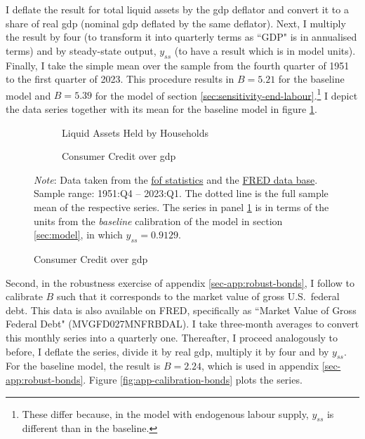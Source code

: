 \documentclass[a4paper,12pt]{article} %
\numberwithin{equation}{section} %
\numberwithin{figure}{section}
\numberwithin{table}{section}
\begin{document}
\begin{refsection}
\begin{appendices}
I deflate the result for total liquid assets by the \Gls{gdp} deflator and convert it to a share of real \Gls{gdp} (nominal \Gls{gdp} deflated by the same deflator). Next, I multiply the result by four (to transform it into quarterly terms as ``GDP" is in annualised terms) and by steady-state output, $y_{ss}$ (to have a result which is in model units). Finally, I take the simple mean over the sample from the fourth quarter of 1951 to the first quarter of 2023. This procedure results in $B=5.21$ for the baseline model and $B=5.39$ for the model of section \ref{sec:sensitivity-end-labour}.\footnote{These differ because, in the model with endogenous labour supply, $y_{ss}$ is different than in the baseline.} I depict the data series together with its mean for the baseline model in figure \ref{fig:app-calibration-liquid}.

\begin{figure}[t]
    \caption{Data for the Baseline Model Calibration}
    \label{fig:app-calibration}
    \centering
    \begin{subfigure}[b]{0.49\textwidth}
    \caption{Liquid Assets Held by Households}
    \label{fig:app-calibration-liquid}
         \centering
         
     \end{subfigure}
     \hfill
     \begin{subfigure}[b]{0.49\textwidth}
     \caption{Consumer Credit over \Gls{gdp}} 
    \label{fig:app-calibration-debt}
         \centering
         
     \end{subfigure}

    \vspace{10pt}
    
    \begin{minipage}{\textwidth} 
    \footnotesize
    \textit{Note}: Data taken from the \href{https://www.federalreserve.gov/releases/z1/}{\Gls{fof} statistics} and the \href{https://fred.stlouisfed.org}{FRED data base}. Sample range: 1951:Q4 -- 2023:Q1. The dotted line is the full sample mean of the respective series. The series in panel \ref{fig:app-calibration-liquid} is in terms of the units from the \textit{baseline} calibration of the model in section \ref{sec:model}, in which $y_{ss} = 0.9129$. 
    \end{minipage}
\end{figure}

Second, in the robustness exercise of appendix \ref{sec-app:robust-bonds}, I follow \textcite{bayer2023} to calibrate $B$ such that it corresponds to the market value of gross U.S.~federal debt. This data is also available on FRED, specifically as ``Market Value of Gross Federal Debt" (MVGFD027MNFRBDAL). I take three-month averages to convert this monthly series into a quarterly one. Thereafter, I proceed analogously to before, I deflate the series, divide it by real \Gls{gdp}, multiply it by four and by $y_{ss}$. For the baseline model, the result is $B=2.24$, which is used in appendix \ref{sec-app:robust-bonds}. Figure \ref{fig:app-calibration-bonds} plots the series.


\end{appendices}
\end{refsection}
\end{document}
